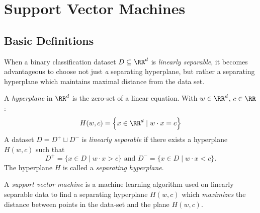 \section{Support Vector Machines}
\label{sec:svm}

\subsection{Basic Definitions} When a binary classification dataset $D \subseteq \RR^d$ is \emph{linearly separable}, it becomes advantageous to choose not just \emph{a} separating hyperplane, but rather a separating hyperplane which maintains maximal distance from the data set.

\begin{definition}
  A \emph{hyperplane} in $\RR^d$ is the zero-set of a linear equation. With $w \in \RR^d$, $c \in \RR$:
  \begin{equation}
    \label{eq:hyperplane}
    H(w,c) = \left\{ x \in \RR^d \mid w \cdot x = c \right\}
  \end{equation}
  A dataset $D = D^+ \sqcup D^-$ is \emph{linearly separable} if there exists a hyperplane $H(w,c)$ such that
  \begin{equation}
    \label{eq:lin-sep}
    D^+ = \{x \in D \mid w \cdot x > c\} \text{ and } D^- = \{x \in D \mid w \cdot x < c\}.
  \end{equation}
  The hyperplane $H$ is called a \emph{separating hyperplane}.
\end{definition}

\begin{definition}
  A \emph{support vector machine} is a machine learning algorithm used on linearly separable data to find a separating hyperplane $H(w,c)$ which \emph{maximizes} the distance between points in the data-set and the plane $H(w,c)$.
\end{definition}

